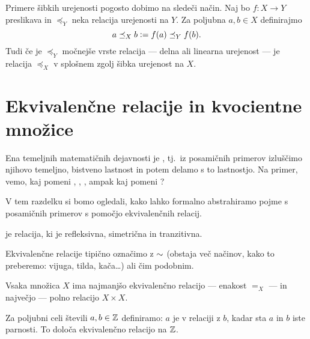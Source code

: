                 Primere šibkih urejenosti pogosto dobimo na sledeči način. Naj bo $f\colon X \to Y$ preslikava in $\preceq_Y$ neka relacija urejenosti na $Y$. Za poljubna $a, b \in X$ definirajmo
                \[a \preceq_X b \mathrel{\mathop:}= f(a) \preceq_Y f(b).\]
                Tudi če je $\preceq_Y$ močnejše vrste relacija --- delna ali linearna urejenost --- je relacija $\preceq_X$ v splošnem zgolj šibka urejenost na $X$.





        \section{Ekvivalenčne relacije in kvocientne množice}

                Ena temeljnih matematičnih dejavnosti je  , tj.~iz posamičnih primerov izluščimo njihovo temeljno, bistveno lastnost in potem delamo s to lastnostjo.  Na primer, vemo, kaj pomeni , , , ampak kaj pomeni ?

                V tem razdelku si bomo ogledali, kako lahko formalno abstrahiramo pojme s posamičnih primerov s pomočjo ekvivalenčnih relacij.

                \begin{definicija}
                         je relacija, ki je refleksivna, simetrična in tranzitivna.
                \end{definicija}

                Ekvivalenčne relacije tipično označimo z $\sim$ (obstaja več načinov, kako to preberemo: vijuga, tilda, kača\ldots) ali čim podobnim.

                \begin{zgled}
                        Vsaka množica $X$ ima najmanjšo ekvivalenčno relacijo --- enakost $=_X$ --- in največjo --- polno relacijo $X \times X$.
                \end{zgled}

                \begin{zgled}
                        Za poljubni celi števili $a, b \in \mathbb{Z}$ definiramo: $a$ je v relaciji z $b$, kadar sta $a$ in $b$ iste parnosti. To določa ekvivalenčno relacijo na $\mathbb{Z}$.
                \end{zgled}


